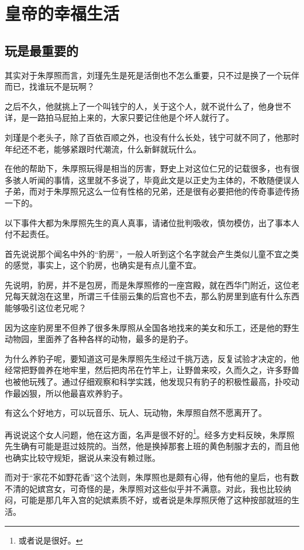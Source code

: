 \section{皇帝的幸福生活}
\ifnum{}
	\begin{multicols}{\theparacolNo}
		\fi
		\subsection{玩是最重要的}
		其实对于朱厚照而言，刘瑾先生是死是活倒也不怎么重要，只不过是换了一个玩伴而已，找谁玩不是玩啊？

		之后不久，他就挑上了一个叫钱宁的人，关于这个人，就不说什么了，他身世不详，是一路拍马屁拍上来的，大家只要记住他是个坏人就行了。

		刘瑾是个老头子，除了百依百顺之外，也没有什么长处，钱宁可就不同了，他那时年纪还不老，能够紧跟时代潮流，什么新鲜就玩什么。

		在他的帮助下，朱厚照玩得是相当的厉害，野史上对这位仁兄的记载很多，也有很多骇人听闻的事情，这里就不多说了，毕竟此文是以正史为主体的，不敢随便误人子弟，而对于朱厚照兄这么一位有性格的兄弟，还是很有必要把他的传奇事迹传扬一下的。

		以下事件大都为朱厚照先生的真人真事，请诸位批判吸收，慎勿模仿，出了事本人付不起责任。

		首先说说那个闻名中外的“豹房”，一般人听到这个名字就会产生类似儿童不宜之类的感觉，事实上，这个豹房，也确实是有点儿童不宜。

		先说明，豹房，并不是包房，而是朱厚照修的一座宫殿，就在西华门附近，这位老兄每天就泡在这里，所谓三千佳丽云集的后宫也不去，那么豹房里到底有什么东西能够吸引这位老兄呢？

		因为这座豹房里不但养了很多朱厚照从全国各地找来的美女和乐工，还是他的野生动物园，里面养了各种各样的动物，最多的是豹子。

		为什么养豹子呢，要知道这可是朱厚照先生经过千挑万选，反复试验才决定的，他经常把野兽养在地牢里，然后把肉吊在竹竿上，让野兽来咬，久而久之，许多野兽也被他玩残了。通过仔细观察和科学实践，他发现只有豹子的积极性最高，扑咬动作最凶狠，所以他最喜欢养豹子。

		有这么个好地方，可以玩音乐、玩人、玩动物，朱厚照自然不愿离开了。

		再说说这个女人问题，他在这方面，名声是很不好的\footnote{或者说是很好。}。经多方史料反映，朱厚照先生确有可能是逛过妓院的。当然，他是换掉那套上班的黄色制服才去的，而且他也确实比较守规矩，据说从来没有赖过账。

		而对于“家花不如野花香”这个法则，朱厚照也是颇有心得，他有他的皇后，也有数不清的妃嫔宫女，可奇怪的是，朱厚照对这些似乎并不满意。对此，我也比较纳闷，可能是那几年入宫的妃嫔素质不好，或者说是朱厚照厌倦了这种按部就班的生活。


\end{multicols}
